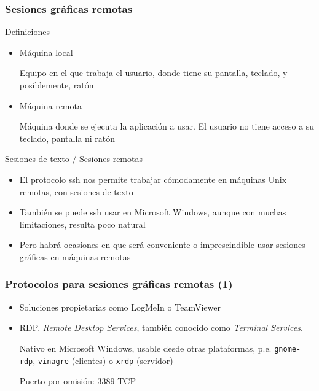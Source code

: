 \documentclass[ucs]{beamer}
\begin{document}
\begin{frame}[fragile]
\frametitle{Sesiones gráficas remotas}

Definiciones 

\begin{itemize}
\item
Máquina local

Equipo en el que trabaja el usuario, donde tiene su pantalla, teclado, y posiblemente, ratón

\item
Máquina remota

Máquina donde se ejecuta la aplicación a usar. El usuario no tiene acceso a su
teclado, pantalla ni ratón
\end{itemize}


Sesiones de texto / Sesiones remotas

\begin{itemize}
\item
El protocolo ssh nos permite trabajar cómodamente en máquinas
Unix remotas, con sesiones de texto 


\item
También se puede ssh usar en Microsoft Windows, aunque con muchas limitaciones, resulta
poco natural

\item
Pero habrá ocasiones en que será conveniente o imprescindible usar
sesiones gráficas en máquinas remotas

\end{itemize}
\end{frame}



\begin{frame}[fragile]
\frametitle{ Protocolos para sesiones gráficas remotas (1)}
\begin{itemize}
\item
Soluciones propietarias como LogMeIn o TeamViewer

\item
RDP. \emph{Remote Desktop Services}, también conocido como  \emph{Terminal Services}.  

Nativo en Microsoft Windows, usable desde otras plataformas, p.e. \verb|gnome-rdp|, \verb|vinagre| (clientes) 
o \verb|xrdp| (servidor) 

Puerto por omisión: 3389 TCP
\end{itemize}

\end{frame}
\end{document}
